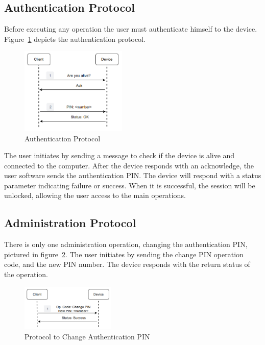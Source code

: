 \subsection{Authentication Protocol}\label{chap:implementation:protocol:auth}

Before executing any operation the user must authenticate himself to the device.
Figure~\ref{fig:protocol:authentication} depicts the authentication protocol.

\begin{figure}[h!]
	\centering
	\includegraphics[width=0.45\textwidth]{./Images/authentication.png}
	\caption{Authentication Protocol}
	\label{fig:protocol:authentication}
\end{figure}

The user initiates by sending a message to check if the device is alive and connected to the computer. After the device responds with an acknowledge, the user software sends the authentication \ac{PIN}. The device will respond with a status parameter indicating failure or success. When it is successful, the session will be unlocked, allowing the user access to the main operations.

\subsection{Administration Protocol}\label{chap:implementation:protocol:admin}

There is only one administration operation, changing the authentication \ac{PIN}, pictured in figure~\ref{fig:protocol:change-PIN}.
The user initiates by sending the change \ac{PIN} operation code, and the new \ac{PIN} number. The device responds with the return status of the operation.

\begin{figure}[h!]
	\centering
	\includegraphics[width=0.4\textwidth]{./Images/change-PIN.png}
	\caption{Protocol to Change Authentication PIN}
	\label{fig:protocol:change-PIN}
\end{figure}

